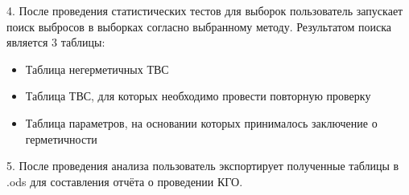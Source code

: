 4. После проведения статистических тестов для выборок пользователь запускает поиск выбросов в выборках согласно выбранному методу. Результатом поиска является 3 таблицы:
\begin{itemize}
	\item Таблица негерметичных ТВС
	\item Таблица ТВС, для которых необходимо провести повторную проверку
	\item Таблица параметров, на основании которых принималось заключение о герметичности
\end{itemize}

5. После проведения анализа пользователь экспортирует полученные таблицы в .ods для составления отчёта о проведении КГО.